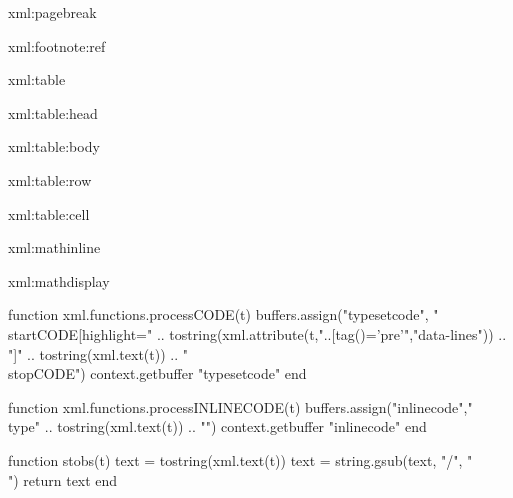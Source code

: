 \startxmlsetups xml:pagebreak
\stopxmlsetups

\startnotmode[nofootnotes]
\startxmlsetups xml:footnote:ref
\stopxmlsetups
\stopnotmode

\startxmlsetups xml:table
  \startembeddedxtable[option=stretch]
  \stopembeddedxtable
\stopxmlsetups

\startxmlsetups xml:table:head
  \startxtablehead
  \stopxtablehead
\stopxmlsetups

\startxmlsetups xml:table:body
  \startxtablebody
  \stopxtablebody
\stopxmlsetups

\startxmlsetups xml:table:row
  \startxrow
  \stopxrow
\stopxmlsetups

\startxmlsetups xml:table:cell
  {\startxcell[align={flushleft,lohi}]}
  {
    {\startxcell[align={middle,lohi}]}
    {\startxcell[align={flushright,lohi}]}}
  \stopxcell
\stopxmlsetups

\startxmlsetups xml:mathinline
\stopxmlsetups

\startxmlsetups xml:mathdisplay
  \startformula
  \stopformula
\stopxmlsetups

\usemodule[vim]
\setupvimtyping[vimcommand=nvim]

\startluacode
    function xml.functions.processCODE(t)
        buffers.assign("typesetcode",
        "\\startCODE[highlight={" ..
          tostring(xml.attribute(t,"..[tag()='pre'","data-lines"))
              .. "}]\n" .. tostring(xml.text(t)) .. "\n\\stopCODE")
        context.getbuffer { "typesetcode" }
    end

    function xml.functions.processINLINECODE(t)
        buffers.assign("inlinecode","\\type{" .. tostring(xml.text(t)) .. "}")
        context.getbuffer { "inlinecode" }
    end
    
    function stobs(t)
      text = tostring(xml.text(t))
      text = string.gsub(text, "/", "\\")
      return text
    end
    
